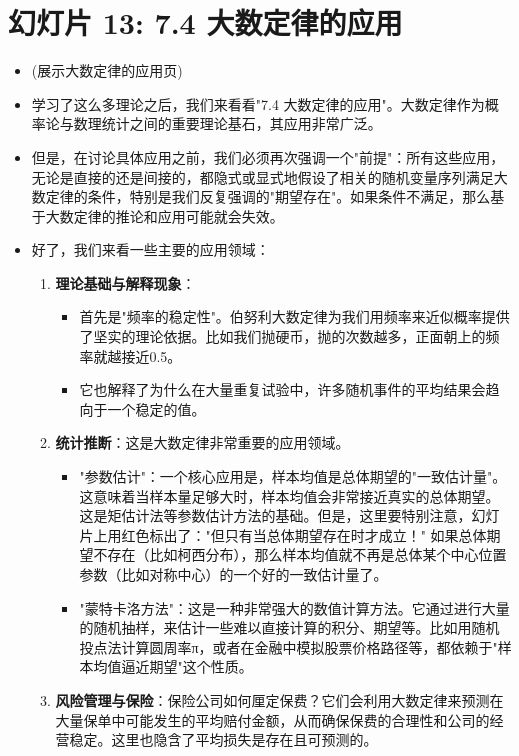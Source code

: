 \documentclass[UTF8]{article} %
\begin{document}
\section*{幻灯片 13: 7.4 大数定律的应用}
\begin{itemize}
    \itemsep1em
    \item (展示大数定律的应用页)
    \item 学习了这么多理论之后，我们来看看"7.4 大数定律的应用"。大数定律作为概率论与数理统计之间的重要理论基石，其应用非常广泛。
    \item 但是，在讨论具体应用之前，我们必须再次强调一个"前提"：所有这些应用，无论是直接的还是间接的，都隐式或显式地假设了相关的随机变量序列满足大数定律的条件，特别是我们反复强调的"期望存在"。如果条件不满足，那么基于大数定律的推论和应用可能就会失效。
    \item 好了，我们来看一些主要的应用领域：
    \begin{enumerate}[label=\arabic*., itemsep=0.5em]
        \item \textbf{理论基础与解释现象}：
        \begin{itemize}[label=\textbullet, itemsep=0.2em]
            \item 首先是"频率的稳定性"。伯努利大数定律为我们用频率来近似概率提供了坚实的理论依据。比如我们抛硬币，抛的次数越多，正面朝上的频率就越接近0.5。
            \item 它也解释了为什么在大量重复试验中，许多随机事件的平均结果会趋向于一个稳定的值。
        \end{itemize}
        \item \textbf{统计推断}：这是大数定律非常重要的应用领域。
        \begin{itemize}[label=\textbullet, itemsep=0.2em]
            \item "参数估计"：一个核心应用是，样本均值是总体期望的"一致估计量"。这意味着当样本量足够大时，样本均值会非常接近真实的总体期望。这是矩估计法等参数估计方法的基础。但是，这里要特别注意，幻灯片上用红色标出了："但只有当总体期望存在时才成立！" 如果总体期望不存在（比如柯西分布），那么样本均值就不再是总体某个中心位置参数（比如对称中心）的一个好的一致估计量了。
            \item "蒙特卡洛方法"：这是一种非常强大的数值计算方法。它通过进行大量的随机抽样，来估计一些难以直接计算的积分、期望等。比如用随机投点法计算圆周率π，或者在金融中模拟股票价格路径等，都依赖于"样本均值逼近期望"这个性质。
        \end{itemize}
        \item \textbf{风险管理与保险}：保险公司如何厘定保费？它们会利用大数定律来预测在大量保单中可能发生的平均赔付金额，从而确保保费的合理性和公司的经营稳定。这里也隐含了平均损失是存在且可预测的。

\end{enumerate}
\end{itemize}
\end{document}
